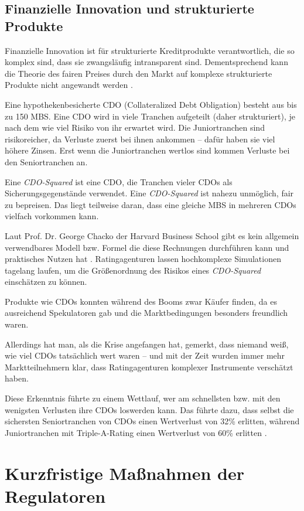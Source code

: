 \documentclass[a4paper,11pt]{report}
\begin{document}
\section{Finanzielle Innovation und strukturierte Produkte}
Finanzielle Innovation ist f\"ur strukturierte
Kreditprodukte verantwortlich, die so komplex sind, dass sie
zwangsl\"aufig intransparent sind. Dementsprechend
kann die Theorie des fairen Preises durch den Markt 
auf komplexe strukturierte Produkte nicht angewandt werden \parencite{crottycam}.

Eine hypothekenbesicherte CDO (Collateralized Debt 
Obligation) besteht aus bis zu 150 MBS.
Eine CDO wird in viele
Tranchen aufgeteilt (daher strukturiert), je nach dem wie viel Risiko von ihr erwartet wird.
Die Juniortranchen sind risikoreicher, da Verluste zuerst bei
ihnen ankommen -- daf\"ur haben sie viel h\"ohere Zinsen.
Erst wenn die Juniortranchen wertlos sind
kommen Verluste bei den Seniortranchen an.

Eine \textit{CDO-Squared}
ist eine CDO, die Tranchen vieler CDOs als Sicherungsgegenst\"ande verwendet.
Eine \textit{CDO-Squared} ist nahezu unm\"oglich, fair zu bepreisen. Das liegt teilweise
daran, dass eine gleiche MBS in mehreren CDOs vielfach vorkommen kann.

Laut Prof. Dr. George Chacko der Harvard Business School gibt es kein
allgemein verwendbares Modell bzw. Formel die diese Rechnungen durchf\"uhren kann
und praktisches Nutzen hat \parencite[226]{chackocred}. Ratingagenturen lassen
hochkomplexe Simulationen tagelang laufen, um die
Gr\"oßenordnung des Risikos eines \textit{CDO-Squared}
einsch\"atzen zu k\"onnen.

Produkte wie CDOs konnten w\"ahrend des Booms zwar K\"aufer finden, da  
es ausreichend Spekulatoren gab und die Marktbedingungen besonders
freundlich waren.

Allerdings hat man, als die Krise angefangen hat, gemerkt, dass niemand weiß,
wie viel CDOs tats\"achlich wert waren -- und mit der Zeit wurden immer mehr
Marktteilnehmern klar, dass Ratingagenturen komplexer Instrumente versch\"atzt haben.

Diese Erkenntnis f\"uhrte zu einem Wettlauf, wer am schnellsten bzw. mit den wenigsten
Verlusten ihre CDOs loswerden kann. Das f\"uhrte dazu, dass selbst die sichersten
Seniortranchen von CDOs einen Wertverlust von 32\% erlitten, w\"ahrend Juniortranchen mit
Triple-A-Rating einen Wertverlust von 60\% erlitten \parencite[567]{crottycam}.

\chapter{Kurzfristige Maßnahmen der Regulatoren}
\end{document}
